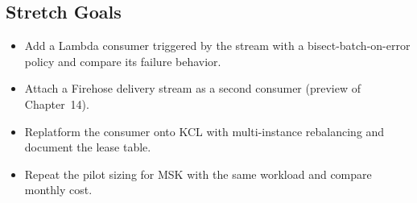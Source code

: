 \subsection*{Stretch Goals}
\begin{itemize}
    \item Add a Lambda consumer triggered by the stream with a bisect-batch-on-error policy and compare its failure behavior.
    \item Attach a Firehose delivery stream as a second consumer (preview of Chapter~14).
    \item Replatform the consumer onto KCL with multi-instance rebalancing and document the lease table.
    \item Repeat the pilot sizing for MSK with the same workload and compare monthly cost.
\end{itemize}
